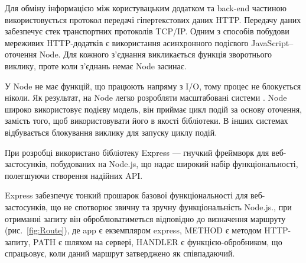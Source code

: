 Для обміну інформацією між користувацьким додатком та back-end частиною використовується протокол передачі гіпертекстових даних HTTP. Передачу даних забезпечує стек транспортних протоколів TCP/IP.
Одним з способів побудови мереживих HTTP-додатків є використання  асинхронного подієвого JavaScript–оточення Node. Для кожного з’єднання викликається функція зворотнього виклику, проте коли з’єднань немає Node засинає.

У Node не має функцій, що працюють напряму з I/O, тому процес не блокується ніколи. Як результат, на Node легко розробляти масштабовані системи \cite{zeiss2015node}.
Node широко використовує подієву модель, він приймає цикл подій за основу оточення, замість того, щоб використовувати його в якості бібліотеки. В інших системах відбувається блокування виклику для запуску циклу подій.

При розробці використано бібліотеку Express — гнучкий фреймворк для веб-застосунків, побудованих на Node.js, що надає широкий набір функціональності, полегшуючи створення надійних API.

Express забезпечує тонкий прошарок базової функціональності для веб-застосунків, що не спотворює звичну та зручну функціональність Node.js., при отриманні запиту він оброблюватиметься відповідно до визначення маршруту (рис.~\ref{fig:Route}), де app є екземпляром express, METHOD є методом HTTP-запиту, PATH є шляхом на сервері, HANDLER є функцією-обробником, що спрацьовує, коли даний маршрут затверджено як співпадаючий.

